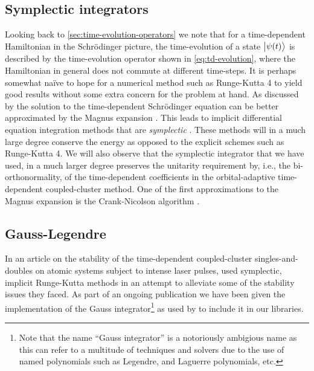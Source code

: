         \subsection{Symplectic integrators}
            Looking back to \autoref{sec:time-evolution-operators} we note that
            for a time-dependent Hamiltonian in the Schrödinger picture, the
            time-evolution of a state $\ket{\psi(t)}$ is described by the
            time-evolution operator shown in \autoref{eq:td-evolution}, where
            the Hamiltonian in general does not commute at different time-steps.
            It is perhaps somewhat naïve to hope for a numerical method such as
            Runge-Kutta 4 to yield good results without some extra concern for
            the problem at hand.
            As discussed by \citeauthor{joshua-magnus} \cite{joshua-magnus} the
            solution to the time-dependent Schrödinger equation can be better
            approximated by the Magnus expansion \cite{magnus-expansion}.
            This leads to implicit differential equation integration methods
            that are \emph{symplectic} \cite{joshua-magnus}.
            These methods will in a much large degree conserve the energy as
            opposed to the explicit schemes such as Runge-Kutta 4.
            We will also observe that the symplectic integrator that we have
            used, in a much larger degree preserves the unitarity requirement
            by, i.e., the bi-orthonormality, of the time-dependent coefficients
            in the orbital-adaptive time-dependent coupled-cluster method.
            One of the first approximations to the Magnus expansion is the
            Crank-Nicolson algorithm \cite{ullrich2011time}.


        \subsection{Gauss-Legendre}
            In an article on the stability of the time-dependent coupled-cluster
            singles-and-doubles on atomic systems subject to intense laser
            pulses, \citeauthor{pedersen2018symplectic}
            \cite{pedersen2018symplectic} used symplectic, implicit Runge-Kutta
            methods in an attempt to alleviate some of the stability issues they
            faced.
            As part of an ongoing publication we have been given the
            implementation of the Gauss integrator\footnote{%
                Note that the name ``Gauss integrator'' is a notoriously
                ambigious name as this can refer to a multitude of techniques
                and solvers due to the use of named polynomials such as
                Legendre, and Laguerre polynomials, etc.%
            } as used by \citeauthor{pedersen2018symplectic}
            \cite{pedersen2018symplectic} to include it in our libraries.
